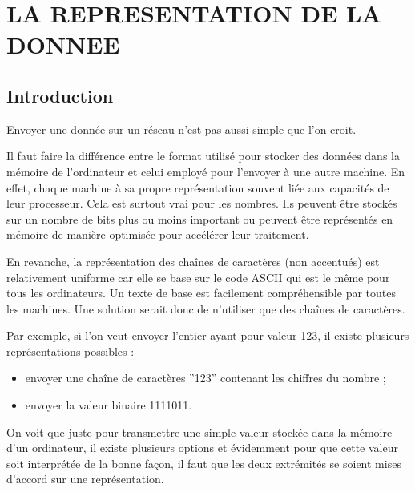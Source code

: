 \cleardoublepage

\chapter{LA REPRESENTATION DE LA DONNEE}

\section{Introduction}
     \vspace{1em}

Envoyer une donnée sur un réseau n’est pas aussi simple que l’on croit.
     \vspace{1em}

 \begin{figure}
\end{figure}
Il faut faire la différence entre le format utilisé pour stocker des données dans la mémoire de l'ordinateur et celui employé pour l'envoyer à une autre machine. En effet, chaque machine à sa propre représentation souvent liée aux capacités de leur processeur. Cela est surtout vrai pour les nombres. Ils peuvent être stockés sur un nombre de bits plus ou moins important ou peuvent être représentés en mémoire de manière optimisée pour accélérer leur traitement. 

En revanche, la représentation des chaînes de caractères (non accentués) est relativement uniforme car elle se base sur le code ASCII qui est le même pour tous les ordinateurs. Un texte de base est facilement compréhensible par toutes les machines. Une solution serait donc de n'utiliser que des chaînes de caractères. 

     \vspace{1em}

Par exemple, si l’on veut envoyer l'entier ayant pour valeur 123, il existe plusieurs représentations possibles :
\begin{itemize}
\item envoyer une chaîne de caractères ”123” contenant les chiffres du nombre ;
\item envoyer la valeur binaire 1111011.
\end{itemize}

     \vspace{1em}

On voit que juste pour transmettre une simple valeur stockée dans la mémoire d'un ordinateur, il existe plusieurs options et évidemment pour que cette valeur soit interprétée de la bonne façon, il faut que les deux extrémités se soient mises d'accord sur une représentation.

